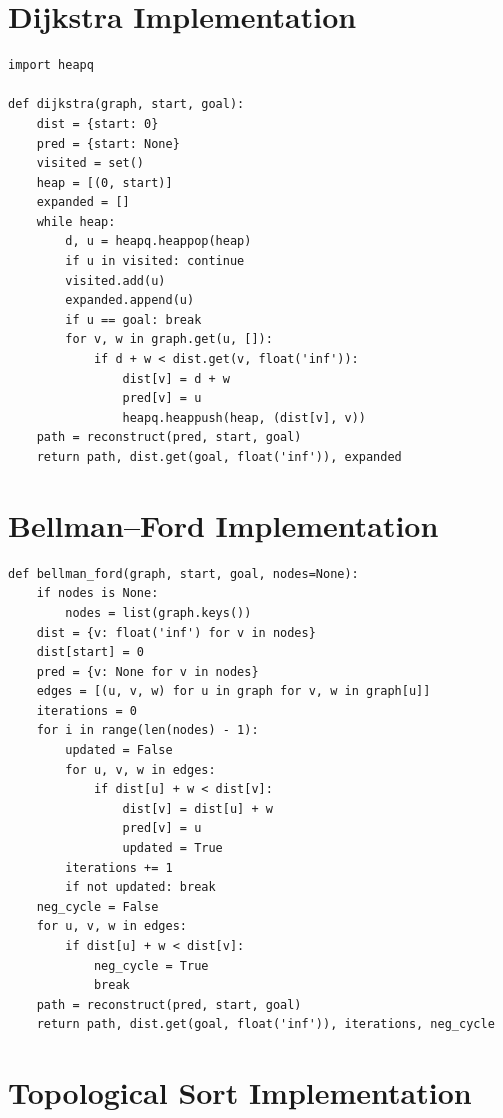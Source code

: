 \documentclass[12pt, a4paper, oneside]{report}
\theoremstyle{definition}
\begin{document}
\section{Dijkstra Implementation}

\begin{lstlisting}[caption={Dijkstra with path reconstruction (from core.algorithms)}]
import heapq

def dijkstra(graph, start, goal):
    dist = {start: 0}
    pred = {start: None}
    visited = set()
    heap = [(0, start)]
    expanded = []
    while heap:
        d, u = heapq.heappop(heap)
        if u in visited: continue
        visited.add(u)
        expanded.append(u)
        if u == goal: break
        for v, w in graph.get(u, []):
            if d + w < dist.get(v, float('inf')):
                dist[v] = d + w
                pred[v] = u
                heapq.heappush(heap, (dist[v], v))
    path = reconstruct(pred, start, goal)
    return path, dist.get(goal, float('inf')), expanded
\end{lstlisting}

\section{Bellman--Ford Implementation}

\begin{lstlisting}[caption={Bellman-Ford with 4 return values matching the core API (from core.algorithms)}]
def bellman_ford(graph, start, goal, nodes=None):
    if nodes is None:
        nodes = list(graph.keys())
    dist = {v: float('inf') for v in nodes}
    dist[start] = 0
    pred = {v: None for v in nodes}
    edges = [(u, v, w) for u in graph for v, w in graph[u]]
    iterations = 0
    for i in range(len(nodes) - 1):
        updated = False
        for u, v, w in edges:
            if dist[u] + w < dist[v]:
                dist[v] = dist[u] + w
                pred[v] = u
                updated = True
        iterations += 1
        if not updated: break
    neg_cycle = False
    for u, v, w in edges:
        if dist[u] + w < dist[v]:
            neg_cycle = True
            break
    path = reconstruct(pred, start, goal)
    return path, dist.get(goal, float('inf')), iterations, neg_cycle
\end{lstlisting}

\section{Topological Sort Implementation}
\end{document}
